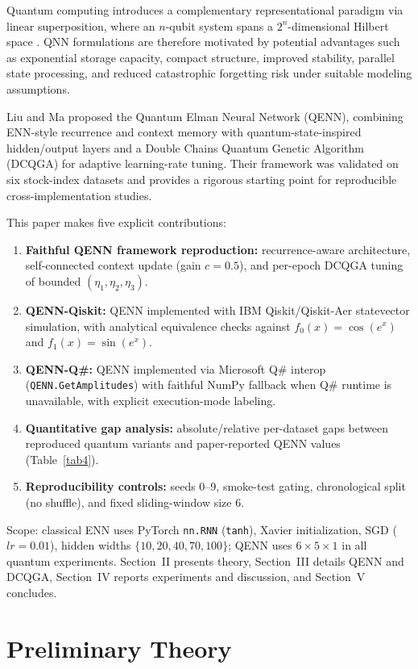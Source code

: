 \documentclass[conference]{IEEEtran}
\begin{document}
Quantum computing introduces a complementary representational paradigm via linear superposition, where an $n$-qubit system spans a $2^n$-dimensional Hilbert space \cite{ref3,ref16,ref18,ref21,ref28}. QNN formulations are therefore motivated by potential advantages such as exponential storage capacity, compact structure, improved stability, parallel state processing, and reduced catastrophic forgetting risk under suitable modeling assumptions.

Liu and Ma \cite{ref43} proposed the Quantum Elman Neural Network (QENN), combining ENN-style recurrence and context memory with quantum-state-inspired hidden/output layers and a Double Chains Quantum Genetic Algorithm (DCQGA) for adaptive learning-rate tuning. Their framework was validated on six stock-index datasets and provides a rigorous starting point for reproducible cross-implementation studies.

This paper makes five explicit contributions:
\begin{enumerate}
\item \textbf{Faithful QENN framework reproduction:} recurrence-aware architecture, self-connected context update (gain $c=0.5$), and per-epoch DCQGA tuning of bounded $(\eta_1,\eta_2,\eta_3)$.
\item \textbf{QENN-Qiskit:} QENN implemented with IBM Qiskit/Qiskit-Aer statevector simulation, with analytical equivalence checks against $f_0(x)=\cos(e^x)$ and $f_1(x)=\sin(e^x)$.
\item \textbf{QENN-Q\#:} QENN implemented via Microsoft Q\# interop (\texttt{QENN.GetAmplitudes}) with faithful NumPy fallback when Q\# runtime is unavailable, with explicit execution-mode labeling.
\item \textbf{Quantitative gap analysis:} absolute/relative per-dataset gaps between reproduced quantum variants and paper-reported QENN values (Table~\ref{tab4}).
\item \textbf{Reproducibility controls:} seeds 0--9, smoke-test gating, chronological split (no shuffle), and fixed sliding-window size 6.
\end{enumerate}

Scope: classical ENN uses PyTorch \texttt{nn.RNN} (\texttt{tanh}), Xavier initialization, SGD ($lr=0.01$), hidden widths $\{10,20,40,70,100\}$; QENN uses $6\times5\times1$ in all quantum experiments. Section~II presents theory, Section~III details QENN and DCQGA, Section~IV reports experiments and discussion, and Section~V concludes.

\section{Preliminary Theory}
\end{document}
